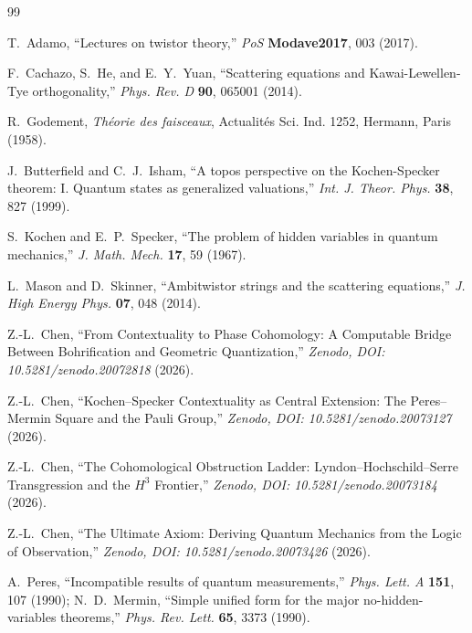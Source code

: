 \documentclass[11pt,a4paper]{article}
\theoremstyle{remark}
\begin{document}
\begin{thebibliography}{99}

T.~Adamo,
``Lectures on twistor theory,''
\textit{PoS} \textbf{Modave2017}, 003 (2017).

F.~Cachazo, S.~He, and E.~Y.~Yuan,
``Scattering equations and Kawai-Lewellen-Tye orthogonality,''
\textit{Phys. Rev. D} \textbf{90}, 065001 (2014).

R.~Godement,
\textit{Th\'eorie des faisceaux},
Actualit\'es Sci. Ind. 1252,
Hermann, Paris (1958).

J.~Butterfield and C.~J.~Isham,
``A topos perspective on the Kochen-Specker theorem: I. Quantum
states as generalized valuations,''
\textit{Int. J. Theor. Phys.} \textbf{38}, 827 (1999).

S.~Kochen and E.~P.~Specker,
``The problem of hidden variables in quantum mechanics,''
\textit{J. Math. Mech.} \textbf{17}, 59 (1967).

L.~Mason and D.~Skinner,
``Ambitwistor strings and the scattering equations,''
\textit{J. High Energy Phys.} \textbf{07}, 048 (2014).

Z.-L.~Chen,
``From Contextuality to Phase Cohomology:
A Computable Bridge Between Bohrification and Geometric Quantization,''
\textit{Zenodo, DOI: 10.5281/zenodo.20072818} (2026).

Z.-L.~Chen,
``Kochen--Specker Contextuality as Central Extension:
The Peres--Mermin Square and the Pauli Group,''
\textit{Zenodo, DOI: 10.5281/zenodo.20073127} (2026).

Z.-L.~Chen,
``The Cohomological Obstruction Ladder:
Lyndon--Hochschild--Serre Transgression and the $H^3$ Frontier,''
\textit{Zenodo, DOI: 10.5281/zenodo.20073184} (2026).

Z.-L.~Chen,
``The Ultimate Axiom:
Deriving Quantum Mechanics from the Logic of Observation,''
\textit{Zenodo, DOI: 10.5281/zenodo.20073426} (2026).

A.~Peres,
``Incompatible results of quantum measurements,''
\textit{Phys. Lett. A} \textbf{151}, 107 (1990);
N.~D.~Mermin,
``Simple unified form for the major no-hidden-variables theorems,''
\textit{Phys. Rev. Lett.} \textbf{65}, 3373 (1990).


\end{thebibliography}
\end{document}
